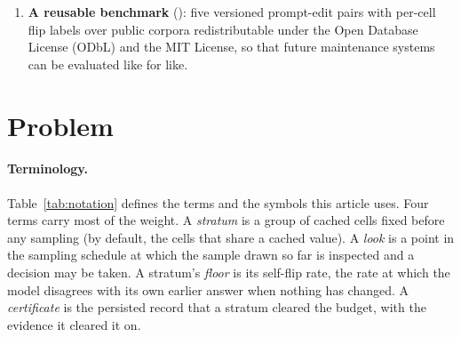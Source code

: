 \begin{enumerate}
and minority-stratum volatility. It includes a stratifier ablation and a calibration
study of how often the procedure certifies past the budget. \ifnum{}\relax It checks the cross-row
independence assumption and prices the dependence the check leaves
open. \fi \famCountWordCap\ further models from four providers
test the qualitative structure, \famFivePairFamiliesWord\ of them on
all five pairs.
A re-certification
\driftDaysLater\ days after the column was built measured drift
of the served model as a higher flip rate against the same cache, and
certified both budgets again. \ifnum{}\relax A free-text
pilot () calibrates a judge's error on two
labelers' hand labels, folds it into the budget, and finds that the
calibration moves with the labeler.\fi
\item \textbf{A reusable benchmark} (): five
versioned prompt-edit pairs with per-cell flip labels over public
corpora redistributable under the Open Database License (ODbL) and the
MIT License, so that future maintenance systems can be evaluated like
for like.
\end{enumerate}

\venueroadmap

\keepheading
\section{Problem}
\label{sec:problem}

\keeprunin
\paragraph{Terminology.} Table~\ref{tab:notation} defines the terms
and the symbols this article uses. Four terms carry most of the weight.
A \emph{stratum} is a group of cached cells fixed before any sampling
(by default, the cells that share a cached value). A \emph{look} is a
point in the sampling schedule at which the sample drawn so far is
inspected and a decision may be taken. A stratum's \emph{floor} is its
self-flip rate, the rate at which the model disagrees with its own
earlier answer when nothing has changed. A \emph{certificate} is the
persisted record that a stratum cleared the budget, with the evidence it
cleared it on.

